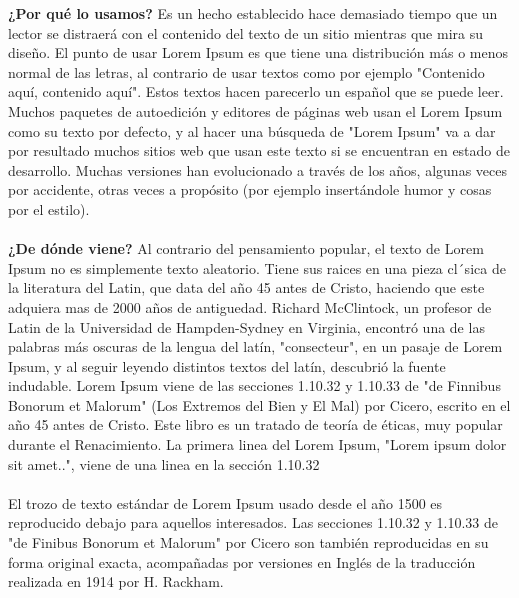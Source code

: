 \documentclass[letterpaper, 12pt]{article}
\begin{document}
    \textbf{¿Por qué lo usamos?}
    Es un hecho establecido hace demasiado tiempo que un lector se distraerá con el contenido del texto de un sitio 
    mientras que mira su diseño. El punto de usar Lorem Ipsum es que tiene una distribución más o menos normal de las 
    letras, al contrario de usar textos como por ejemplo "Contenido aquí, contenido aquí". Estos textos hacen parecerlo 
    un español que se puede leer. Muchos paquetes de autoedición y editores de páginas web usan el Lorem Ipsum como 
    su texto por defecto, y al hacer una búsqueda de "Lorem Ipsum" va a dar por resultado muchos sitios web que usan 
    este texto si se encuentran en estado de desarrollo. Muchas versiones han evolucionado a través de los años, algunas 
    veces por accidente, otras veces a propósito (por ejemplo insertándole humor y cosas por el estilo). \\ \\


    \textbf{¿De dónde viene?}
    Al contrario del pensamiento popular, el texto de Lorem Ipsum no es simplemente texto aleatorio. Tiene sus raices en 
    una pieza cl´sica de la literatura del Latin, que data del año 45 antes de Cristo, haciendo que este adquiera mas de 
    2000 años de antiguedad. Richard McClintock, un profesor de Latin de la Universidad de Hampden-Sydney en Virginia, 
    encontró una de las palabras más oscuras de la lengua del latín, "consecteur", en un pasaje de Lorem Ipsum, y al seguir 
    leyendo distintos textos del latín, descubrió la fuente indudable. Lorem Ipsum viene de las secciones 1.10.32 y 1.10.33 
    de "de Finnibus Bonorum et Malorum" (Los Extremos del Bien y El Mal) por Cicero, escrito en el año 45 antes de Cristo. 
    Este libro es un tratado de teoría de éticas, muy popular durante el Renacimiento. La primera linea del Lorem Ipsum, 
    "Lorem ipsum dolor sit amet..", viene de una linea en la sección 1.10.32 \\ \\ 

    El trozo de texto estándar de Lorem Ipsum usado desde el año 1500 es reproducido debajo para aquellos interesados. 
    Las secciones 1.10.32 y 1.10.33 de "de Finibus Bonorum et Malorum" por Cicero son también reproducidas en su forma original 
    exacta, acompañadas por versiones en Inglés de la traducción realizada en 1914 por H. Rackham. \\ \\
\end{document}
